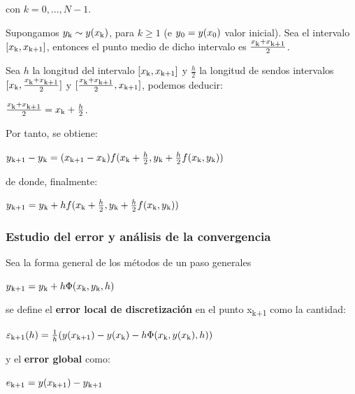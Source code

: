 \documentclass[paper=a4, fontsize=11pt]{scrartcl} %
\numberwithin{equation}{section}
\begin{document}
	\setlength{\parskip}{10pt}con $k = 0, ..., N-1$.
	
	Supongamos $y\textsubscript{k}	\sim y(x\textsubscript{k})$, para $k \geq 1$ (e $y\textsubscript{0} = y(x\textsubscript{0})$ valor inicial).
	Sea el intervalo $[x\textsubscript{k}, x\textsubscript{k+1}]$, entonces el punto medio de dicho intervalo es $\frac{x\textsubscript{k} + x\textsubscript{k+1}}{2}$.
	
	Sea $h$ la longitud del intervalo $[x\textsubscript{k}, x\textsubscript{k+1}]$ y $\frac{h}{2}$ la longitud de sendos intervalos $[x\textsubscript{k}, \frac{x\textsubscript{k} + x\textsubscript{k+1}}{2}]$ y $[\frac{x\textsubscript{k} + x\textsubscript{k+1}}{2}, x\textsubscript{k+1}]$, podemos deducir:
	\begin{center}
		$\frac{x\textsubscript{k} + x\textsubscript{k+1}}{2} = x\textsubscript{k} + \frac{h}{2}$.
	\end{center}
	
	Por tanto, se obtiene:
	\begin{center}
		$y\textsubscript{k+1} - y\textsubscript{k} = (x\textsubscript{k+1} - x\textsubscript{k})f(x\textsubscript{k} + \frac{h}{2}, y\textsubscript{k} + \frac{h}{2}f(x\textsubscript{k}, y\textsubscript{k}))$
		
		de donde, finalmente:
		
		$y\textsubscript{k+1} = y\textsubscript{k} + hf(x\textsubscript{k} + \frac{h}{2}, y\textsubscript{k} + \frac{h}{2}f(x\textsubscript{k}, y\textsubscript{k}))$
	\end{center}
	
	
	\subsubsection{Estudio del error y análisis de la convergencia}
	Sea la forma general de los métodos de un paso generales
	\begin{center}
		$y\textsubscript{k+1} = y\textsubscript{k} + h\Phi(x\textsubscript{k},y\textsubscript{k},h)$
	\end{center}
	se define el \textbf{error local de discretización} en el punto x\textsubscript{k+1} como la cantidad:
	\begin{center}
		$\varepsilon\textsubscript{k+1}(h) = \frac{1}{h}(y(x\textsubscript{k+1}) - y(x\textsubscript{k}) - h\Phi(x\textsubscript{k},y(x\textsubscript{k}),h))$
	\end{center}
	y el \textbf{error global} como:
	\begin{center}
		$e\textsubscript{k+1} = y(x\textsubscript{k+1}) - y\textsubscript{k+1}$
	\end{center}
	
\end{document}
